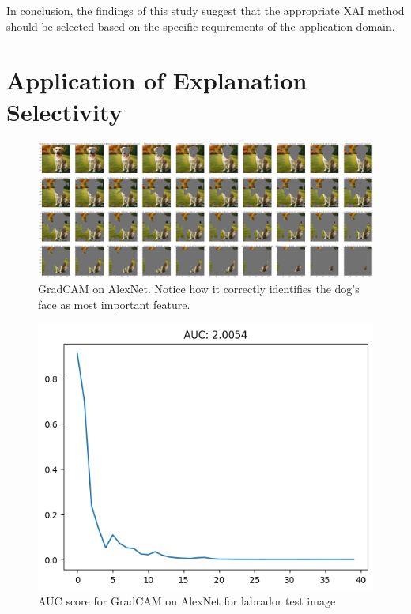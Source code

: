 \documentclass{article}
\begin{document}
In conclusion, the findings of this study suggest that the appropriate XAI method should be selected based on the specific requirements of the application domain.








\appendix

\section{Application of Explanation Selectivity}
\begin{figure}
    \centering
    \includegraphics[width=1\linewidth]{results/gradcam-labrador-feature-removal.png}
    \caption{GradCAM on AlexNet. Notice how it correctly identifies the dog's face as most important feature.}
    \label{fig:gradcam-labrador-feature-removal}
\end{figure}


\begin{figure}
    \centering
    \includegraphics[width=1\linewidth]{results/gradcam-labrador-auc.png}
    \caption{AUC score for GradCAM on AlexNet for labrador test image}
    \label{fig:gradcam-labrador-auc}
\end{figure}
\end{document}
